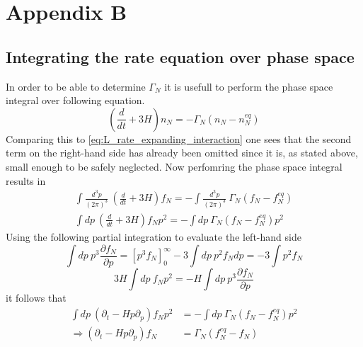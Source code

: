 \chapter{Appendix B}
\section{Integrating the rate equation over phase space}
\label{ap:phase_space}
In order to be able to determine $\Gamma_N$ it is usefull to perform the phase space integral over following equation. 
\begin{equation*}
\left(\frac{d}{dt}+3H\right)n_N=-\Gamma_N\left(n_N-n_N^{eq}\right)
\end{equation*}
Comparing this to \ref{eq:L_rate_expanding_interaction} one sees that the second term on the right-hand side has already been omitted since it is, as stated above, small enough to be safely neglected. \newline
Now perfomring the phase space integral results in
\begin{align*}
\int\frac{d^3p}{\left(2\pi\right)^3}\: \left(\frac{d}{dt}+3H\right)f_N=-\int\frac{d^3p}{\left(2\pi\right)^3}\:\Gamma_N\left(f_N-f_N^{eq}\right)\\
\int dp\: \left(\frac{d}{dt}+3H\right)f_Np^2=-\int dp\:\Gamma_N\left(f_N-f_N^{eq}\right)p^2
\end{align*}
Using the following partial integration to evaluate the left-hand side
\begin{equation*}
\int dp\:p^3\frac{\partial f_N}{\partial p}=\left[p^3f_N\right]_0^\infty-3\int dp\:p^2f_Ndp=-3\int p^2f_N
\end{equation*}
\begin{equation*}
3H\int dp\: f_Np^2=-H\int dp\: p^3\frac{\partial f_N}{\partial p}
\end{equation*}
it follows that
\begin{align*}
\int  dp\:\left(\partial_t-Hp\partial_p\right)f_Np^2&=-\int dp\:\Gamma_N\left(f_N-f_N^{eq}\right)p^2\\
\Rightarrow \left(\partial_t-Hp\partial_p\right)f_N&=\Gamma_N\left(f_N^{eq}-f_N\right)
\end{align*}
